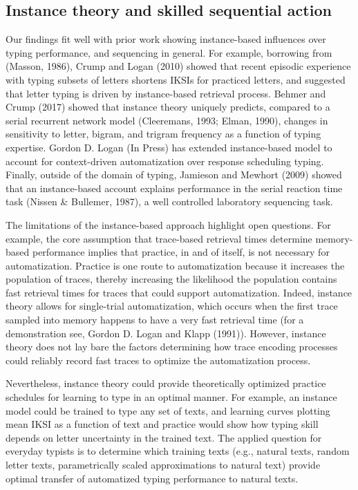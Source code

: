 \documentclass[floatsintext,man]{apa6}
\theoremstyle{definition}
\theoremstyle{definition}
\theoremstyle{definition}
\theoremstyle{remark}
\begin{document}
\subsection{Instance theory and skilled sequential
action}\label{instance-theory-and-skilled-sequential-action}

Our findings fit well with prior work showing instance-based influences
over typing performance, and sequencing in general. For example,
borrowing from (Masson, 1986), Crump and Logan (2010) showed that recent
episodic experience with typing subsets of letters shortens IKSIs for
practiced letters, and suggested that letter typing is driven by
instance-based retrieval process. Behmer and Crump (2017) showed that
instance theory uniquely predicts, compared to a serial recurrent
network model (Cleeremans, 1993; Elman, 1990), changes in sensitivity to
letter, bigram, and trigram frequency as a function of typing expertise.
Gordon D. Logan (In Press) has extended instance-based model to account
for context-driven automatization over response scheduling typing.
Finally, outside of the domain of typing, Jamieson and Mewhort (2009)
showed that an instance-based account explains performance in the serial
reaction time task (Nissen \& Bullemer, 1987), a well controlled
laboratory sequencing task.

The limitations of the instance-based approach highlight open questions.
For example, the core assumption that trace-based retrieval times
determine memory-based performance implies that practice, in and of
itself, is not necessary for automatization. Practice is one route to
automatization because it increases the population of traces, thereby
increasing the likelihood the population contains fast retrieval times
for traces that could support automatization. Indeed, instance theory
allows for single-trial automatization, which occurs when the first
trace sampled into memory happens to have a very fast retrieval time
(for a demonstration see, Gordon D. Logan and Klapp (1991)). However,
instance theory does not lay bare the factors determining how trace
encoding processes could reliably record fast traces to optimize the
automatization process.

Nevertheless, instance theory could provide theoretically optimized
practice schedules for learning to type in an optimal manner. For
example, an instance model could be trained to type any set of texts,
and learning curves plotting mean IKSI as a function of text and
practice would show how typing skill depends on letter uncertainty in
the trained text. The applied question for everyday typists is to
determine which training texts (e.g., natural texts, random letter
texts, parametrically scaled approximations to natural text) provide
optimal transfer of automatized typing performance to natural texts.
\end{document}
